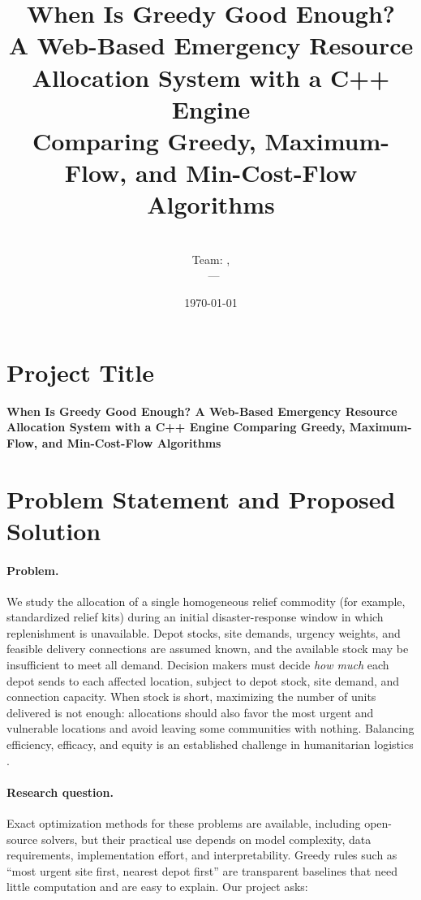 \documentclass[11pt]{article}
\title{\textbf{When Is Greedy Good Enough?\\[2pt]
\large A Web-Based Emergency Resource Allocation System with a C++ Engine\\
Comparing Greedy, Maximum-Flow, and Min-Cost-Flow Algorithms}}
\author{\me\ \\ \small Team: \nameA, \nameB \\ \small \course\ --- \instructor}
\date{\today}
\begin{document}
\maketitle

\section{Project Title}
\textbf{When Is Greedy Good Enough? A Web-Based Emergency Resource Allocation System with a C++ Engine Comparing Greedy, Maximum-Flow, and Min-Cost-Flow Algorithms}

\section{Problem Statement and Proposed Solution}

\paragraph{Problem.}
We study the allocation of a single homogeneous relief commodity (for
example, standardized relief kits) during an initial disaster-response window
in which replenishment is unavailable. Depot stocks, site demands, urgency
weights, and feasible delivery connections are assumed known, and the
available stock may be insufficient to meet all demand. Decision makers must
decide \emph{how much} each depot sends to each affected location, subject to
depot stock, site demand, and connection capacity. When stock is short,
maximizing the number of units delivered is not enough: allocations should
also favor the most urgent and vulnerable locations and avoid leaving some
communities with nothing. Balancing efficiency, efficacy, and equity is an
established challenge in humanitarian logistics
\cite{huang2012,gutjahr2016,mostajabdaveh2025}.

\paragraph{Research question.}
Exact optimization methods for these problems are available, including
open-source solvers, but their practical use depends on model complexity,
data requirements, implementation effort, and interpretability. Greedy rules
such as ``most urgent site first, nearest depot first'' are transparent
baselines that need little computation and are easy to explain. Our project
asks:
\end{document}
